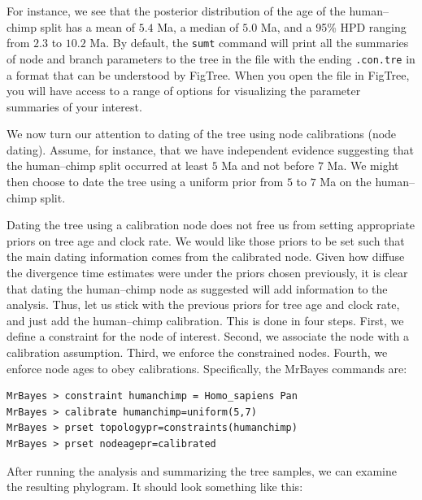 \documentclass[12pt]{book}
\newcommand{\ttt}[1]{\texttt{#1}}
\begin{document}
For instance, we see that the posterior distribution of the age of the human--chimp split has a
mean of $5.4$ Ma, a median of $5.0$ Ma, and a 95\% HPD ranging from $2.3$ to $10.2$ Ma. By default,
the \ttt{sumt} command will print all the summaries of node and branch parameters to the tree in
the file with the ending \ttt{.con.tre} in a format that can be understood by FigTree. When you
open the file in FigTree, you will have access to a range of options for visualizing the parameter
summaries of your interest.

We now turn our attention to dating of the tree using node calibrations (node dating). Assume, for
instance, that we have independent evidence suggesting that the human--chimp split occurred at
least $5$ Ma and not before $7$ Ma. We might then choose to date the tree using a uniform prior
from $5$ to $7$ Ma on the human--chimp split.

Dating the tree using a calibration node does not free us from setting appropriate priors on tree
age and clock rate. We would like those priors to be set such that the main dating information
comes from the calibrated node. Given how diffuse the divergence time estimates were under the
priors chosen previously, it is clear that dating the human--chimp node as suggested will add
information to the analysis. Thus, let us stick with the previous priors for tree age and clock
rate, and just add the human--chimp calibration. This is done in four steps. First, we define a
constraint for the node of interest. Second, we associate the node with a calibration assumption.
Third, we enforce the constrained nodes. Fourth, we enforce node ages to obey calibrations.
Specifically, the MrBayes commands are:

\begin{singlespacing}
\begin{verbatim}
MrBayes > constraint humanchimp = Homo_sapiens Pan
MrBayes > calibrate humanchimp=uniform(5,7)
MrBayes > prset topologypr=constraints(humanchimp)
MrBayes > prset nodeagepr=calibrated
\end{verbatim}
\end{singlespacing}

After running the analysis and summarizing the tree samples, we can examine the resulting
phylogram. It should look something like this:
\end{document}

